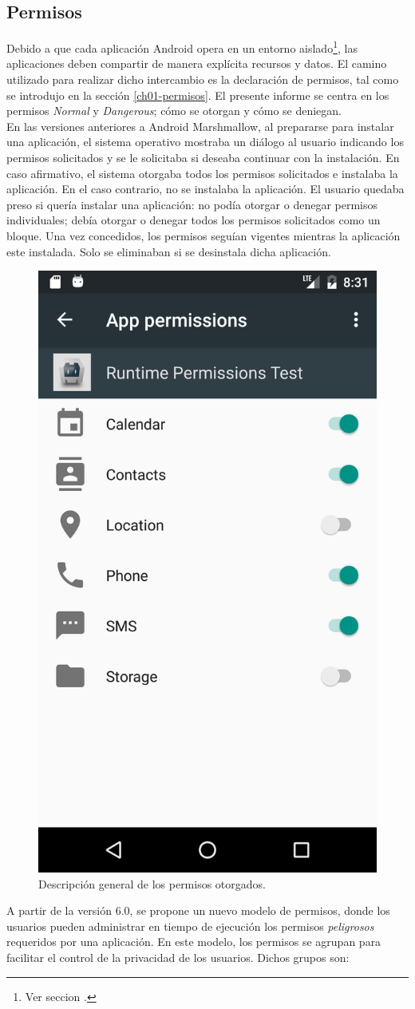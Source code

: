 \subsection{Permisos}
Debido a que cada aplicación Android opera en un entorno aislado\footnote{Ver seccion .}, las aplicaciones deben compartir de manera explícita recursos y datos. El camino utilizado para realizar dicho intercambio es la declaración de permisos, tal como se introdujo en la sección \ref{ch01-permisos}. El presente informe se centra en los permisos \emph{Normal} y \emph{Dangerous}; cómo se otorgan y cómo se deniegan.\\
En las versiones anteriores a Android Marshmallow, al prepararse para instalar una aplicación, el sistema operativo mostraba un diálogo al usuario indicando los permisos solicitados y se le solicitaba si deseaba continuar con la instalación. En caso afirmativo, el sistema otorgaba todos los permisos solicitados e instalaba la aplicación. En el caso contrario, no se instalaba la aplicación. El usuario quedaba preso si quería instalar una aplicación: no podía otorgar o denegar permisos individuales; debía otorgar o denegar todos los permisos solicitados como un bloque. Una vez concedidos, los permisos seguían vigentes mientras la aplicación este instalada. Solo se eliminaban si se desinstala dicha aplicación.\\
\begin{figure}[hbtp]
    \centering
        \includegraphics[width=.3\linewidth]{imgs/chapter1/app-permissions}
    \caption{Descripción general de los permisos otorgados.}
	\label{fig:ch01:app-permissions-overview}
\end{figure}
A partir de la versión 6.0, se propone un nuevo modelo de permisos, donde los usuarios pueden administrar en tiempo de ejecución los permisos \textit{peligrosos} requeridos por una aplicación. En este modelo, los permisos se agrupan para facilitar el control de la privacidad de los usuarios. Dichos grupos son:
